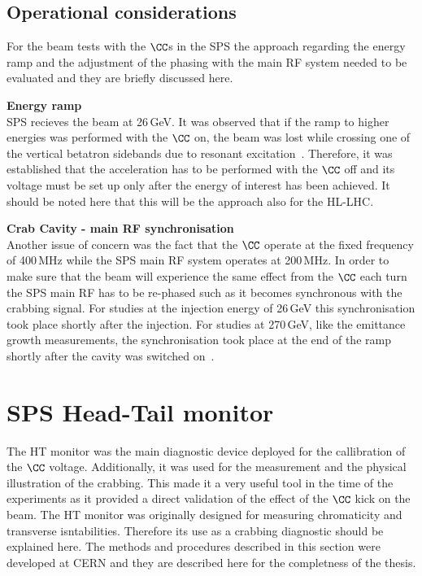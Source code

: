 \subsection{Operational considerations}

For the beam tests with the $\CC$s in the SPS the approach regarding the energy ramp and the adjustment of the phasing with the main RF system needed to be evaluated and they are briefly discussed here.


\normalsize{\textbf{Energy ramp}}\\
SPS recieves the beam at 26\,GeV. It was observed that if the ramp to higher energies was performed with the $\CC$ on, the beam was lost while crossing one of the vertical betatron sidebands due to resonant excitation~\cite{Rama_Paris_persentation}. Therefore, it was established that the acceleration has to be performed with the $\CC$ off and its voltage must be set up only after the energy of interest has been achieved. It should be noted here that this will be the approach also for the HL-LHC.

\normalsize{\textbf{Crab Cavity - main RF synchronisation}}\\
Another issue of concern was the fact that the $\CC$ operate at the fixed frequency of 400\,MHz while the SPS main RF system operates at 200\,MHz.
In order to make sure that the beam will experience the same effect from the $\CC$ each turn the SPS main RF has to be re-phased such as it becomes synchronous with the crabbing signal. For studies at the injection energy of 26\,GeV this synchronisation took place shortly after the injection. For studies at 270\,GeV, like the emittance growth measurements, the synchronisation took place at the end of the ramp shortly after the cavity was switched on~\cite{BE_seminar}.


\section{SPS Head-Tail monitor}\label{sec:HT_info}
The HT monitor was the main diagnostic device deployed for the callibration of the $\CC$ voltage. Additionally, it was used for the measurement and the physical illustration of the crabbing. This made it a very useful tool in the time of the experiments as it provided a direct validation of the effect of the $\CC$ kick on the beam. The HT monitor was originally designed for measuring chromaticity and transverse isntabilities. Therefore its use as a crabbing diagnostic should be explained here. The methods and procedures described in this section were developed at CERN and they are described here for the completness of the thesis.

